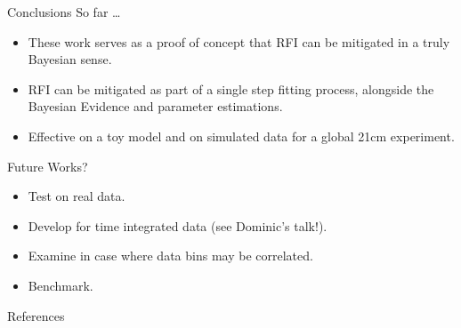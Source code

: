 \documentclass{beamer}
\begin{document}
\begin{frame}{Conclusions}
So far \dots
\begin{itemize}
    \item These work serves as a proof of concept that RFI can be mitigated in a truly Bayesian sense.
    \item RFI can be mitigated as part of a single step fitting process, alongside the Bayesian Evidence and parameter estimations.
    \item Effective on a toy model and on simulated data for a global 21cm experiment.
\end{itemize}
Future Works?
\begin{itemize}
    \item Test on real data.
    \item Develop for time integrated data (see Dominic's talk!).
    \item Examine in case where data bins may be correlated.
    \item Benchmark.
\end{itemize}

\end{frame}

\begin{frame}[t]{References}

\end{frame}
\end{document}

